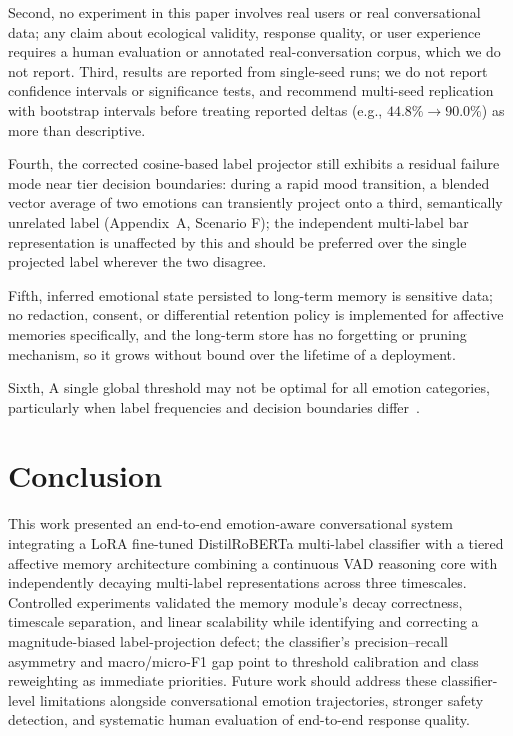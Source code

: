 \documentclass[graybox]{svmult}
\begin{document}
Second, no experiment in this paper involves real
users or real conversational data; any claim about ecological validity,
response quality, or user experience requires a human evaluation or
annotated real-conversation corpus, which we do not report. Third,
results are reported from single-seed runs; we do not report confidence
intervals or significance tests, and recommend multi-seed replication
with bootstrap intervals before treating reported deltas (e.g.,
$44.8\%\rightarrow90.0\%$) as more than descriptive. 

Fourth, the corrected cosine-based label projector still exhibits a residual failure
mode near tier decision boundaries: during a rapid mood transition, a
blended vector average of two emotions can transiently project onto a
third, semantically unrelated label (Appendix~A, Scenario F); the
independent multi-label bar representation is unaffected by this and
should be preferred over the single projected label wherever the two
disagree. 

Fifth, inferred emotional state persisted to long-term memory
is sensitive data; no redaction, consent, or differential retention
policy is implemented for affective memories specifically, and the
long-term store has no forgetting or pruning mechanism, so it grows
without bound over the lifetime of a deployment.


Sixth, A single global threshold may not be optimal for all emotion categories, particularly when label frequencies and decision boundaries differ~\cite{huang2021limits,huang2021seq2emo}.
    



\section{Conclusion}
\label{sec:conclusion}

This work presented an end-to-end emotion-aware conversational system integrating a LoRA fine-tuned DistilRoBERTa multi-label classifier with a tiered affective memory architecture combining a continuous VAD reasoning core with independently decaying multi-label representations across three timescales. Controlled experiments validated the memory module's decay correctness, timescale separation, and linear scalability while identifying and correcting a magnitude-biased label-projection defect; the classifier's precision--recall asymmetry and macro/micro-F1 gap point to threshold calibration and class reweighting as immediate priorities. Future work should address these classifier-level limitations alongside conversational emotion trajectories, stronger safety detection, and systematic human evaluation of end-to-end response quality.
\end{document}
